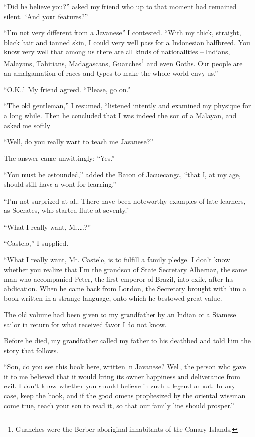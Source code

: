 \documentclass[a4paper,12pt]{book}
\begin{document}
``Did he believe you?'' asked my friend
who up to that moment had remained silent.
``And your features?''

``I'm not very different from a Javanese''
I contested. ``With my thick, straight, black hair
and tanned skin, I could very well pass for
a Indonesian halfbreed. You know very well
that among us there are all kinds of nationalities
-- Indians, Malayans, Tahitians, Madagascans,
Guanches\footnote{Guanches were the Berber aboriginal
inhabitants of the Canary Islands.}
and even Goths. Our people are an amalgamation
of races and types to make the whole world envy us.''

``O.K..'' My friend agreed. ``Please, go on.''

``The old gentleman,''  I resumed,
``listened intently and examined my physique
for a long while. Then he concluded that I was
indeed the son of a Malayan, and asked me softly:

``Well, do you really want to teach me Javanese?''

The answer came unwittingly: ``Yes.''

``You must be astounded,'' added the Baron
of Jacuecanga, ``that I, at my age, should
still have a wont for learning.''

``I'm not surprized at all. There have been
noteworthy examples of late learners,
as Socrates, who started flute at seventy.''

``What I really want, Mr.\ldots?''

``Castelo,'' I supplied.

``What I really want, Mr. Castelo,
is to fulfill a family pledge.
I don't know whether you realize that I'm the
grandson of State Secretary Albernaz, the same
man who accompanied Peter,
the first emperor of Brazil,
into exile, after his abdication.
When he came back from London,
the Secretary brought with him a book written in a strange
language, onto which he bestowed great value.

The old volume had been given to my grandfather
by an Indian or a Siamese sailor in
return for what received favor I do not know.

Before he died, my grandfather called
my father to his deathbed and told him
the story that follows.

``Son, do you see this book here, written in Javanese?
Well, the person who
gave it to me believed that it would bring its owner
happiness and deliverance from evil. I don't know
whether you should believe in such a legend or not.
In any case, keep the book, and if
the good omens prophesized by the oriental wiseman
come true, teach your son to read it,
so that our family line should prosper.''
\end{document}
